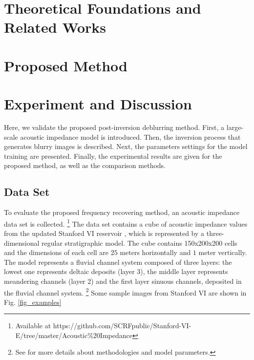 \documentclass[journal]{IEEEtran}
\begin{document}
\section{Theoretical Foundations and Related Works}\label{Theoretics}



\section{Proposed Method}\label{Method}


\section{Experiment and Discussion}\label{Experiments}
Here, we validate the proposed post-inversion deblurring method.
First, a large-scale acoustic impedance model is introduced.
Then, the inversion process that generates blurry images is described.
Next, the parameters settings for the model training are presented.
Finally, the experimental results are given for the proposed method,
as well as the comparison methods.

\subsection{Data Set}
To evaluate the proposed frequency recovering method, an acoustic
impedance data set is collected.
\footnote{Available at https://github.com/SCRFpublic/Stanford-VI-E/tree/master/Acoustic\%20Impedance} %
The data set contains a cube of acoustic impedance values from the updated Stanford VI reservoir \cite{Lee2012},
which is represented by a three-dimensional regular stratigraphic model. The cube contains 150x200x200 cells and 
the dimensions of each cell are $25$ meters horizontally and $1$ meter vertically. The model represents
a fluvial channel system composed of three layers: the lowest one represents deltaic deposits (layer 3), the
middle layer represents meandering channels (layer 2) and the first layer sinuous channels, deposited in the fluvial
channel system. \footnote{See \cite{Castro2005} for more details about methodologies and model parameters.}
Some sample images from Stanford VI are shown in Fig. \ref{fig_examples}
\end{document}
